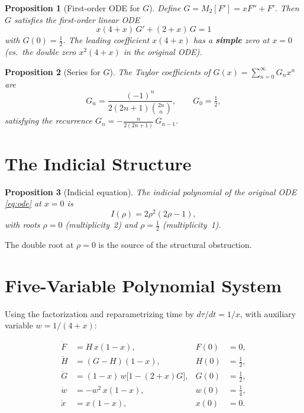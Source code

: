 \documentclass[11pt]{article}
\newtheorem{proposition}{Proposition}
\theoremstyle{definition}
\theoremstyle{remark}
\begin{document}
\begin{proposition}[First-order ODE for $G$]
Define $G = M_2[F'] = xF'' + F'$. Then $G$ satisfies the first-order linear ODE
\begin{equation}\label{eq:G-ode}
  x(4+x)\,G' + (2+x)\,G = 1
\end{equation}
with $G(0) = \frac{1}{2}$. The leading coefficient $x(4+x)$ has a \textbf{simple} zero at $x=0$ (vs.\ the double zero $x^2(4+x)$ in the original ODE).
\end{proposition}

\begin{proposition}[Series for $G$]\label{prop:G-series}
The Taylor coefficients of $G(x) = \sum_{n=0}^{\infty} G_n x^n$ are
\[
  G_n = \frac{(-1)^n}{2(2n+1)\binom{2n}{n}}, \qquad G_0 = \tfrac{1}{2},
\]
satisfying the recurrence $G_n = -\frac{n}{2(2n+1)}\,G_{n-1}$.
\end{proposition}

\section{The Indicial Structure}

\begin{proposition}[Indicial equation]
The indicial polynomial of the original ODE \eqref{eq:ode} at $x=0$ is
\[
  I(\rho) = 2\rho^2(2\rho - 1),
\]
with roots $\rho = 0$ (multiplicity~2) and $\rho = \frac{1}{2}$ (multiplicity~1).
\end{proposition}

The double root at $\rho=0$ is the source of the structural obstruction.

\section{Five-Variable Polynomial System}

Using the factorization and reparametrizing time by $d\tau/dt = 1/x$, with auxiliary variable $w = 1/(4+x)$:

\begin{equation}\label{eq:system}
\begin{aligned}
  \dot{F} &= H\,x(1-x), & F(0) &= 0, \\
  \dot{H} &= (G-H)(1-x), & H(0) &= \tfrac{1}{2}, \\
  \dot{G} &= (1-x)\,w\bigl[1-(2+x)G\bigr], & G(0) &= \tfrac{1}{2}, \\
  \dot{w} &= -w^2\,x(1-x), & w(0) &= \tfrac{1}{4}, \\
  \dot{x} &= x(1-x), & x(0) &= 0.
\end{aligned}
\end{equation}
\end{document}
